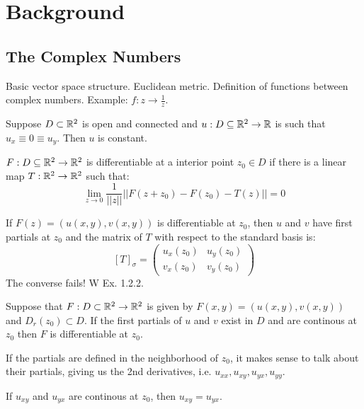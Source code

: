 \documentclass[12pt]{amsart}
\begin{document}


\section{Background}

\subsection{The Complex Numbers}
Basic vector space structure. Euclidean metric. Definition of functions between complex numbers. Example: $f: z \to \frac{1}{z}$. \\

\begin{proposition}[W 1.7]
    Suppose $D \subset \mathbb R^2$ is open and connected and $u: D \subseteq \mathbb R^2 \to \mathbb R$ is such that $u_x \equiv 0 \equiv u_y$. Then $u$ is constant. 
\end{proposition}

\begin{definition}
    $F: D \subseteq \mathbb R^2 \to \mathbb R^2$ is differentiable at a interior point $z_0 \in D$ if there is a linear map $T: \mathbb R^2 \to \mathbb R^2$ such that: 
    \[ \lim_{z \to 0} \frac{1}{||z||} ||F(z+z_0) - F(z_0) -T(z)|| = 0 \]
\end{definition}

\begin{remark}
    If $F(z) = (u(x, y), v(x, y))$ is differentiable at $z_0$, then $u$ and $v$ have first partials at $z_0$ and the matrix of $T$ with respect to the standard basis is:
    \[ [T]_\sigma = \begin{pmatrix}
        u_x(z_0) & u_y(z_0) \\
        v_x(z_0) & v_y(z_0)
    \end{pmatrix}\]
    The converse fails! W Ex. 1.2.2.
\end{remark}


\begin{theorem}[W 1.8]
    Suppose that $F : D \subset \mathbb R^2 \to \mathbb R^2$ is given by $F(x, y) = (u(x,y), v(x,y))$ and $D_r(z_0) \subset D$. If the first partials of $u$ and $v$ exist in $D$ and are continous at $z_0$ then $F$ is differentiable at $z_0$. 
\end{theorem}

If the partials are defined in the neighborhood of $z_0$, it makes sense to talk about their partials, giving us the 2nd derivatives, i.e. $u_{xx}, u_{xy}, u_{yx}, u_{yy}$. 
\begin{theorem}[W 1.9, Clauraut]
    If $u_{xy}$ and $u_{yx}$ are continous at $z_0$, then $u_{xy} = u_{yx}$. 
\end{theorem} 
\end{document}
